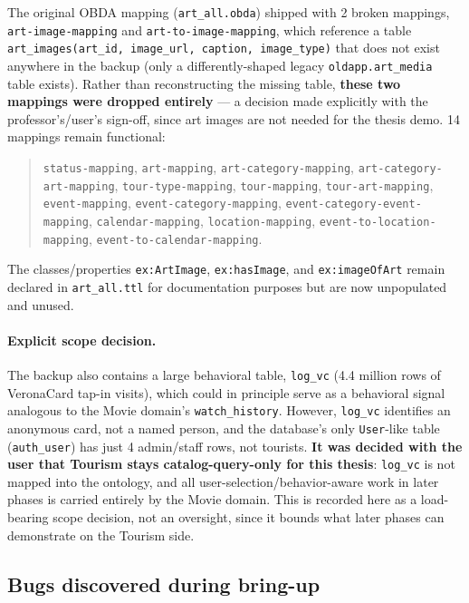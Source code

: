 \documentclass[11pt,a4paper]{article}
\newcommand{\code}[1]{\texttt{#1}}
\begin{document}
The original OBDA mapping (\code{art\_all.obda}) shipped with 2 broken mappings,
\code{art-image-mapping} and \code{art-to-image-mapping}, which reference a table
\code{art\_images(art\_id, image\_url, caption, image\_type)} that does not exist anywhere in the
backup (only a differently-shaped legacy \code{oldapp.art\_media} table exists). Rather than
reconstructing the missing table, \textbf{these two mappings were dropped entirely} --- a
decision made explicitly with the professor's/user's sign-off, since art images are not needed
for the thesis demo. 14 mappings remain functional:

\begin{quote}\footnotesize\raggedright
\code{status-mapping}, \code{art-mapping}, \code{art-category-mapping},
\code{art-category-art-mapping}, \code{tour-type-mapping}, \code{tour-mapping},
\code{tour-art-mapping}, \code{event-mapping}, \code{event-category-mapping},
\code{event-category-event-mapping}, \code{calendar-mapping}, \code{location-mapping},
\code{event-to-location-mapping}, \code{event-to-calendar-mapping}.
\end{quote}

The classes/properties \code{ex:ArtImage}, \code{ex:hasImage}, and \code{ex:imageOfArt} remain
declared in \code{art\_all.ttl} for documentation purposes but are now unpopulated and unused.

\paragraph{Explicit scope decision.}
\label{par:tourism-scope}
The backup also contains a large behavioral table,
\code{log\_vc} (4.4 million rows of VeronaCard tap-in visits), which could in principle serve as
a behavioral signal analogous to the Movie domain's \code{watch\_history}. However,
\code{log\_vc} identifies an anonymous card, not a named person, and the database's only
\code{User}-like table (\code{auth\_user}) has just 4 admin/staff rows, not tourists.
\textbf{It was decided with the user that Tourism stays catalog-query-only for this thesis}:
\code{log\_vc} is not mapped into the ontology, and all user-selection/behavior-aware work in
later phases is carried entirely by the Movie domain. This is recorded here as a load-bearing
scope decision, not an oversight, since it bounds what later phases can demonstrate on the
Tourism side.

\subsection{Bugs discovered during bring-up}
\label{sec:bugs}
\end{document}

